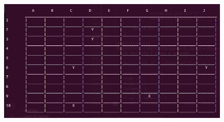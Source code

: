 \documentclass{article}
\begin{document}
	\begin{figure}[H]
		\centering
		\includegraphics[width=1.0\textwidth,keepaspectratio]{img/Commit3.png}
	\end{figure}
\end{document}

